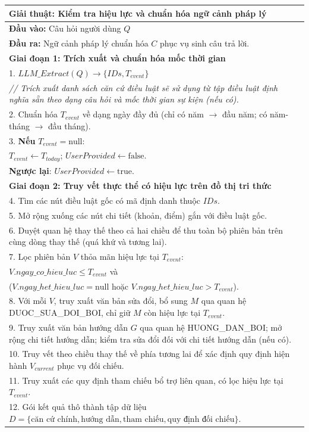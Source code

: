 \documentclass[../DoAn.tex]{subfiles}
\begin{document}
\begin{table}[H]
\centering
\begin{tabular}{|p{15cm}|}
\hline
\textbf{Giải thuật:} Kiểm tra hiệu lực và chuẩn hóa ngữ cảnh pháp lý \\ \hline
\textbf{Đầu vào:} Câu hỏi người dùng $Q$ \\
\textbf{Đầu ra:} Ngữ cảnh pháp lý chuẩn hóa $C$ phục vụ sinh câu trả lời. \\ \hline

\textbf{Giai đoạn 1: Trích xuất và chuẩn hóa mốc thời gian} \\
1. $LLM\_Extract(Q) \rightarrow \{IDs, T_{event}\}$ \\
\textit{// Trích xuất danh sách căn cứ điều luật sẽ sử dụng từ tập điều luật định nghĩa sẵn theo dạng câu hỏi và mốc thời gian sự kiện (nếu có).} \\
2. Chuẩn hóa $T_{event}$ về dạng ngày đầy đủ (chỉ có năm $\rightarrow$ đầu năm; có năm-tháng $\rightarrow$ đầu tháng). \\
3. \textbf{Nếu} $T_{event} = \text{null}$: \\
\quad $T_{event} \leftarrow T_{today}$; $UserProvided \leftarrow \text{false}$. \\
\quad \textbf{Ngược lại}: $UserProvided \leftarrow \text{true}$. \\

\textbf{Giai đoạn 2: Truy vết thực thể có hiệu lực trên đồ thị tri thức} \\
4. Tìm các nút điều luật gốc có mã định danh thuộc $IDs$. \\
5. Mở rộng xuống các nút chi tiết (khoản, điểm) gắn với điều luật gốc. \\
6. Duyệt quan hệ thay thế theo cả hai chiều để thu toàn bộ phiên bản trên cùng dòng thay thế (quá khứ và tương lai). \\
7. Lọc phiên bản $V$ thỏa mãn hiệu lực tại $T_{event}$: \\
\quad $V.ngay\_co\_hieu\_luc \leq T_{event}$ và \\
\quad ($V.ngay\_het\_hieu\_luc = \text{null}$ hoặc $V.ngay\_het\_hieu\_luc > T_{event}$). \\
8. Với mỗi $V$, truy xuất văn bản sửa đổi, bổ sung $M$ qua quan hệ DUOC\_SUA\_DOI\_BOI, chỉ giữ $M$ còn hiệu lực tại $T_{event}$. \\
9. Truy xuất văn bản hướng dẫn $G$ qua quan hệ HUONG\_DAN\_BOI; mở rộng chi tiết hướng dẫn; kiểm tra sửa đổi đối với chi tiết hướng dẫn (nếu có). \\
10. Truy vết theo chiều thay thế về phía tương lai để xác định quy định hiện hành $V_{current}$ phục vụ đối chiếu. \\
11. Truy xuất các quy định tham chiếu bổ trợ liên quan, có lọc hiệu lực tại $T_{event}$. \\
12. Gói kết quả thô thành tập dữ liệu $D = \{\text{căn cứ chính}, \text{hướng dẫn}, \text{tham chiếu}, \text{quy định đối chiếu}\}$. \\


\end{tabular}
\end{table}
\end{document}

